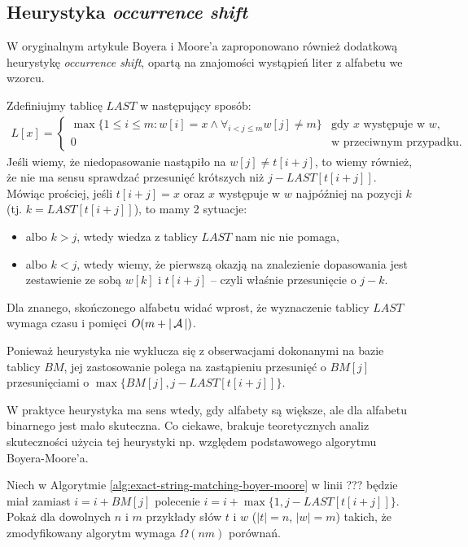 \subsection{Heurystyka \emph{occurrence shift}}

W oryginalnym artykule Boyera i Moore'a zaproponowano również dodatkową heurystykę \emph{occurrence shift}, opartą na znajomości wystąpień liter z alfabetu we wzorcu.

Zdefiniujmy tablicę $LAST$ w następujący sposób:
\begin{align*}
  L[x] =
  \begin{cases}
    \max \{1 \le i \le m: w[i] = x \land \forall_{i < j \le m} w[j] \neq m\} & \text{gdy $x$ występuje w $w$}, \\
    0 & \text{w przeciwnym przypadku}.
  \end{cases}
\end{align*}
Jeśli wiemy, że niedopasowanie nastąpiło na $w[j] \neq t[i + j]$, to wiemy również, że nie ma sensu sprawdzać przesunięć krótszych niż $j - LAST[t[i + j]]$. Mówiąc prościej, jeśli $t[i + j] = x$ oraz $x$ występuje w $w$ najpóźniej na pozycji $k$ (tj. $k = LAST[t[i + j]]$), to mamy 2 sytuacje:
\begin{itemize}
  \item albo $k > j$, wtedy wiedza z tablicy $LAST$ nam nic nie pomaga,
  \item albo $k < j$, wtedy wiemy, że pierwszą okazją na znalezienie dopasowania jest zestawienie ze sobą $w[k]$ i $t[i + j]$ -- czyli właśnie przesunięcie o $j - k$.
\end{itemize}
Dla znanego, skończonego alfabetu widać wprost, że wyznaczenie tablicy $LAST$ wymaga czasu i pomięci $O(m + |\operatorname{\mathcal{A}}|)$.

Ponieważ heurystyka nie wyklucza się z obserwacjami dokonanymi na bazie tablicy $BM$, jej zastosowanie polega na zastąpieniu przesunięć o $BM[j]$ przesunięciami o $\max\{BM[j], j - LAST[t[i + j]]\}$.

W praktyce heurystyka ma sens wtedy, gdy alfabety są większe, ale dla alfabetu binarnego jest mało skuteczna.
Co ciekawe, brakuje teoretycznych analiz skuteczności użycia tej heurystyki np. względem podstawowego algorytmu Boyera-Moore'a.

\begin{problem}{}{}
  Niech w Algorytmie \ref{alg:exact-string-matching-boyer-moore} w linii ??? będzie miał zamiast $i = i + BM[j]$ polecenie $i = i + \max\{1, j - LAST[t[i + j]]\}$.
  Pokaż dla dowolnych $n$ i $m$ przykłady słów $t$ i $w$ ($|t| = n$, $|w| = m$) takich, że zmodyfikowany algorytm wymaga $\Omega(n m)$ porównań.
\end{problem}


